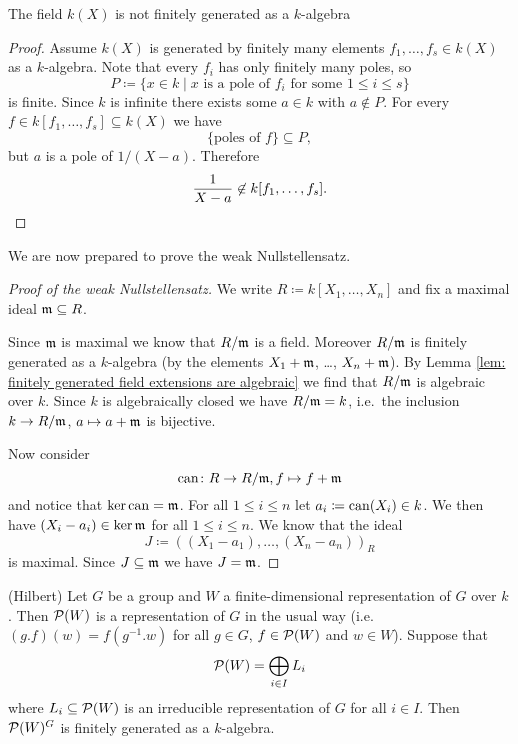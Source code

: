 \begin{rem}
  The field $k(X)$ is not finitely generated as a $k$-algebra
  \begin{proof}
    Assume $k(X)$ is generated by finitely many elements $f_1, \dotsc, f_s \in k(X)$ as a $k$-algebra. Note that every $f_i$ has only finitely many poles, so
    \[
      P \coloneqq \{x \in k \mid \text{$x$ is a pole of $f_i$ for some $1 \leq i \leq s$}\}
    \]
    is finite. Since $k$ is infinite there exists some $a \in k$ with $a \not\in P$. For every $f \in k[f_1, \dotsc, f_s] \subseteq k(X)$ we have
    \[
      \{\text{poles of $f$}\} \subseteq P,
    \]
      but $a$ is a pole of $1/(X-a)$. Therefore
    \[
      \frac{1}{X-a} \not\in k[f_1, \dotsc, f_s].
      \qedhere
    \]
  \end{proof}
\end{rem}


We are now prepared to prove the weak Nullstellensatz.


\begin{proof}[Proof of the weak Nullstellensatz]
  We write $R \coloneqq k[X_1, \dotsc, X_n]$ and fix a maximal ideal $\mathfrak{m} \subseteq R$.
  
  Since $\mathfrak{m}$ is maximal we know that $R / \mathfrak{m}$ is a field.
  Moreover $R / \mathfrak{m}$ is finitely generated as a $k$-algebra (by the elements $X_1 + \mathfrak{m}$, \dots, $X_n + \mathfrak{m}$).
  By Lemma \ref{lem: finitely generated field extensions are algebraic} we find that $R/\mathfrak{m}$ is algebraic over $k$.
  Since $k$ is algebraically closed we have $R / \mathfrak{m} = k$, i.e.\ the inclusion $k \to R / \mathfrak{m}$, $a \mapsto a + \mathfrak{m}$ is bijective.
  
  Now consider
  \[
            \operatorname{can}
    \colon  R \to R / \mathfrak{m},
            f
    \mapsto f + \mathfrak{m}
  \]
  and notice that $\ker \operatorname{can} = \mathfrak{m}$.
  For all $1 \leq i \leq n$ let $a_i \coloneqq \operatorname{can}(X_i) \in k$.
  We then have $(X_i - a_i) \in \ker \mathfrak{m}$ for all $1 \leq i \leq n$.
  We know that the ideal
  \[
              J
    \coloneqq ( (X_1 - a_1), \dotsc, (X_n - a_n) )_R
  \]
  is maximal.
  Since $J \subseteq \mathfrak{m}$ we have $J = \mathfrak{m}$.
\end{proof}


\begin{thrm}(Hilbert)
  Let $G$ be a group and $W$ a finite-dimensional representation of $G$ over $k$.
  Then $\mathcal{P}(W)$ is a representation of $G$ in the usual way (i.e.\ $(g.f)(w) = f\left( g^{-1}.w \right)$ for all $g \in G$, $f \in \mathcal{P}(W)$ and $w \in W$).
  Suppose that
  \[
      \mathcal{P}(W)
    = \bigoplus_{i \in I} L_i
  \]
  where $L_i \subseteq \mathcal{P}(W)$ is an irreducible representation of $G$ for all $i \in I$.
  Then $\mathcal{P}(W)^G$ is finitely generated as a $k$-algebra.
\end{thrm}


